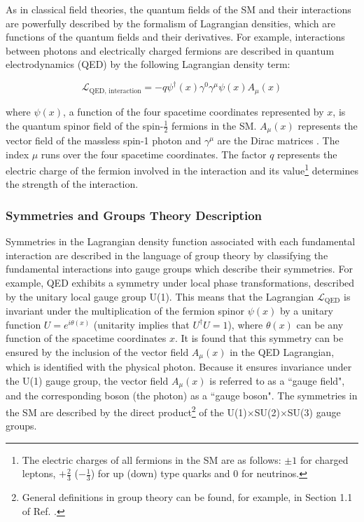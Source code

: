 As in classical field theories, the quantum fields of the SM and their interactions are powerfully described by the formalism of Lagrangian densities, which are functions of the quantum fields and their derivatives. For example, interactions between photons and electrically charged fermions are described in quantum electrodynamics (QED) by the following Lagrangian density term:

\begin{equation}
\label{eq:qed_interaction}
\mathcal{L}_\text{QED, interaction} = -q\psi^\dagger(x)\gamma^0\gamma^\mu\psi(x) A_\mu(x)
\end{equation}

\noindent where \(\psi(x)\), a function of the four spacetime coordinates represented by \(x\), is the quantum spinor field of the spin-\(\frac{1}{2}\) fermions in the SM. \(A_\mu(x)\) represents the vector field of the massless spin-1 photon and \(\gamma^\mu\) are the Dirac matrices \cite{griffiths_2008}. The index \(\mu\) runs over the four spacetime coordinates. The factor \(q\) represents the electric charge of the fermion involved in the interaction and its value\footnote{The electric charges of all fermions in the SM are as follows: \(\pm1\) for charged leptons, \(+\frac{2}{3}\) (\(-\frac{1}{3}\)) for up (down) type quarks and 0 for neutrinos.} determines the strength of the interaction. 

\subsubsection{Symmetries and Groups Theory Description}

Symmetries in the Lagrangian density function associated with each fundamental interaction are described in the language of group theory by classifying the fundamental interactions into gauge groups which describe their symmetries. For example, QED exhibits a symmetry under local phase transformations, described by the unitary local gauge group U(1). This means that the Lagrangian \(\mathcal{L}_\text{QED}\) is invariant under the multiplication of the fermion spinor \(\psi(x)\) by a unitary function \(U = e^{i\theta(x)}\) (unitarity implies that \(U^\dagger U=1\)),
where \(\theta(x)\) can be any function of the spacetime coordinates \(x\). It is found that this symmetry can be ensured by the inclusion of the vector field \(A_\mu(x)\) in the QED Lagrangian, which is identified with the physical photon. Because it ensures invariance under the U(1) gauge group, the vector field \(A_\mu(x)\) is referred to as a ``gauge field", and the corresponding boson (the photon) as a ``gauge boson". The symmetries in the SM are described by the direct product\footnote{General definitions in group theory can be found, for example, in Section 1.1 of Ref. \cite{costa2012symmetries}.} of the U(1)\(\times\)SU(2)\(\times\)SU(3) gauge groups. 


